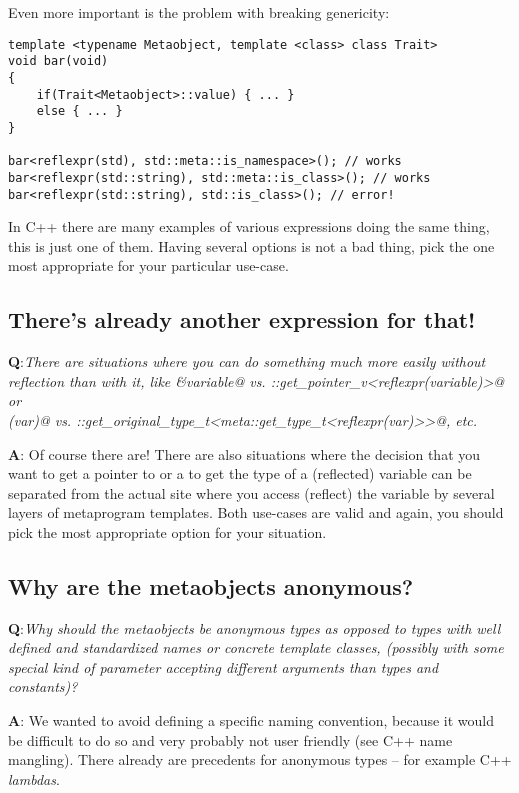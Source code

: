 Even more important is the problem with breaking genericity:

\begin{verbatim}
template <typename Metaobject, template <class> class Trait>
void bar(void)
{
	if(Trait<Metaobject>::value) { ... }
	else { ... }
}

bar<reflexpr(std), std::meta::is_namespace>(); // works
bar<reflexpr(std::string), std::meta::is_class>(); // works
bar<reflexpr(std::string), std::is_class>(); // error!
\end{verbatim}


In C++ there are many examples of various expressions doing the same thing,
this is just one of them.
Having several options is not a bad thing, pick the one most appropriate for your
particular use-case.


\subsection{There's already another expression for that!}

{\textbf Q:}{\em There are situations where you can do something much more
easily without reflection than with it, like \verb@&variable@ vs.
\verb@meta::get_pointer_v<reflexpr(variable)>@ or\\\verb@decltype(var)@ vs.
\verb@meta::get_original_type_t<meta::get_type_t<reflexpr(var)>>@, etc.}

{\textbf A:} Of course there are! There are also situations where the decision
that you want to get a pointer to or a to get the type of a (reflected) variable
can be separated from the actual site where you access (reflect) the variable by
several layers of metaprogram templates. Both use-cases are valid and
again, you should pick the most appropriate option for your situation.

\subsection{Why are the metaobjects anonymous?}

{\textbf Q:}{\em Why should the metaobjects be anonymous types as opposed to
types with well defined and standardized names or concrete template classes, (possibly with some
special kind of parameter accepting different arguments than types and constants)?}

{\textbf A:} We wanted to avoid defining a specific naming convention, because it would
be difficult to do so and very probably not user friendly (see C++ name mangling). There
already are precedents for anonymous types -- for example C++ {\em lambdas}.

